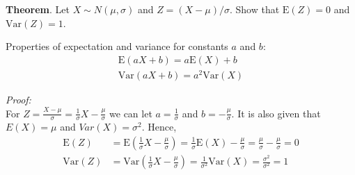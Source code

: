 \documentclass[fleqn, 11pt]{article}
\newcommand{\Var}{\textrm{Var}}
\newcommand{\E}{\textrm{E}}
\begin{document}
\textbf{Theorem}. Let $X \sim N(\mu, \sigma)$ and $Z=(X-\mu) / \sigma$.  Show that $\E(Z) = 0$ and $\Var(Z) = 1$.\\

{\color{blue}
Properties of expectation and variance for constants $a$ and $b$:
\begin{align*}
\E(aX + b) = a \E(X) + b\\
\Var(aX + b) = a^2 \Var(X)
\end{align*}

\emph{Proof:}\\
For $Z = \frac{X-\mu}{\sigma} = \frac{1}{\sigma} X - \frac{\mu}{\sigma}$ we can let $a = \frac{1}{\sigma}$ and $b=- \frac{\mu}{\sigma}$.  It is also given that $E(X) = \mu$ and $Var(X) = \sigma^2$.  Hence,
\begin{align*}
\E(Z) &= \E\left( \frac{1}{\sigma} X - \frac{\mu}{\sigma} \right)
= \frac{1}{\sigma}\E(X) - \frac{\mu}{\sigma}
= \frac{\mu}{\sigma} - \frac{\mu}{\sigma} = 0\\
\Var(Z) &= \Var\left( \frac{1}{\sigma} X - \frac{\mu}{\sigma} \right)
= \frac{1}{\sigma^2}\Var(X)
= \frac{\sigma^2}{\sigma^2} = 1
\end{align*}
}
\end{document}
